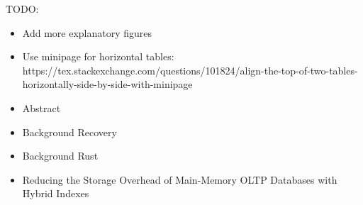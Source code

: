 \color{purple}
TODO:
\begin{itemize}
  \item Add more explanatory figures
  \item Use minipage for horizontal tables: https://tex.stackexchange.com/questions/101824/align-the-top-of-two-tables-horizontally-side-by-side-with-minipage

  \item Abstract

  \item Background Recovery
  \item Background Rust

  \item Reducing the Storage Overhead of Main-Memory OLTP Databases with Hybrid Indexes
\end{itemize}

